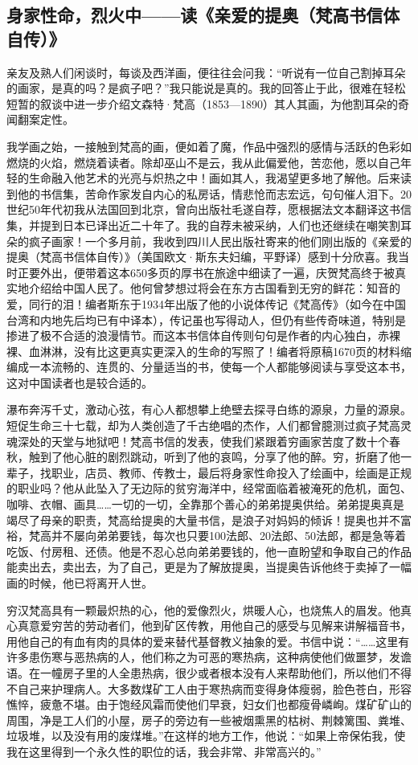 \documentclass{article}
\begin{document}
\subsection{身家性命，烈火中——读《亲爱的提奥（梵高书信体自传）》}
亲友及熟人们闲谈时，每谈及西洋画，便往往会问我：“听说有一位自己割掉耳朵的画家，是真的吗？是疯子吧？”我只能说是真的。我的回答止于此，很难在轻松短暂的叙谈中进一步介绍文森特·梵高（1853—1890）其人其画，为他割耳朵的奇闻翻案定性。

我学画之始，一接触到梵高的画，便如着了魔，作品中强烈的感情与活跃的色彩如燃烧的火焰，燃烧着读者。除却巫山不是云，我从此偏爱他，苦恋他，愿以自己年轻的生命融入他艺术的光亮与炽热之中！画如其人，我渴望更多地了解他。后来读到他的书信集，苦命作家发自内心的私房话，情悲怆而志宏远，句句催人泪下。20世纪50年代初我从法国回到北京，曾向出版社毛遂自荐，愿根据法文本翻译这书信集，并提到日本已译出近二十年了。我的自荐未被采纳，人们也还继续在嘲笑割耳朵的疯子画家！一个多月前，我收到四川人民出版社寄来的他们刚出版的《亲爱的提奥（梵高书信体自传）》（美国欧文·斯东夫妇编，平野译）感到十分欣喜。我当时正要外出，便带着这本650多页的厚书在旅途中细读了一遍，庆贺梵高终于被真实地介绍给中国人民了。他何曾梦想过将会在东方古国看到无穷的鲜花：知音的爱，同行的泪！编者斯东于1934年出版了他的小说体传记《梵高传》（如今在中国台湾和内地先后均已有中译本），传记虽也写得动人，但仍有些传奇味道，特别是掺进了极不合适的浪漫情节。而这本书信体自传则句句是作者的内心独白，赤裸裸、血淋淋，没有比这更真实更深入的生命的写照了！编者将原稿1670页的材料缩编成一本流畅的、连贯的、分量适当的书，使每一个人都能够阅读与享受这本书，这对中国读者也是较合适的。

瀑布奔泻千丈，激动心弦，有心人都想攀上绝壁去探寻白练的源泉，力量的源泉。短促生命三十七载，却为人类创造了千古绝唱的杰作，人们都曾臆测过疯子梵高灵魂深处的天堂与地狱吧！梵高书信的发表，使我们紧跟着穷画家苦度了数十个春秋，触到了他心脏的剧烈跳动，听到了他的哀鸣，分享了他的醉。穷，折磨了他一辈子，找职业，店员、教师、传教士，最后将身家性命投入了绘画中，绘画是正规的职业吗？他从此坠入了无边际的贫穷海洋中，经常面临着被淹死的危机，面包、咖啡、衣帽、画具……一切的一切，全靠那个善心的弟弟提奥供给。弟弟提奥真是竭尽了母亲的职责，梵高给提奥的大量书信，是浪子对妈妈的倾诉！提奥也并不富裕，梵高并不屡向弟弟要钱，每次也只要100法郎、20法郎、50法郎，都是急等着吃饭、付房租、还债。他是不忍心总向弟弟要钱的，他一直盼望和争取自己的作品能卖出去，卖出去，为了自己，更是为了解放提奥，当提奥告诉他终于卖掉了一幅画的时候，他已将离开人世。

穷汉梵高具有一颗最炽热的心，他的爱像烈火，烘暖人心，也烧焦人的眉发。他真心真意爱穷苦的劳动者们，他到矿区传教，用他自己的感受与见解来讲解福音书，用他自己的有血有肉的具体的爱来替代基督教义抽象的爱。书信中说：“……这里有许多患伤寒与恶热病的人，他们称之为可恶的寒热病，这种病使他们做噩梦，发谵语。在一幢房子里的人全患热病，很少或者根本没有人来帮助他们，所以他们不得不自己来护理病人。大多数煤矿工人由于寒热病而变得身体瘦弱，脸色苍白，形容憔悴，疲惫不堪。由于饱经风霜而使他们早衰，妇女们也都瘦骨嶙峋。煤矿矿山的周围，净是工人们的小屋，房子的旁边有一些被烟熏黑的枯树、荆棘篱围、粪堆、垃圾堆，以及没有用的废煤堆。”在这样的地方工作，他说：“如果上帝保佑我，使我在这里得到一个永久性的职位的话，我会非常、非常高兴的。”
\end{document}
